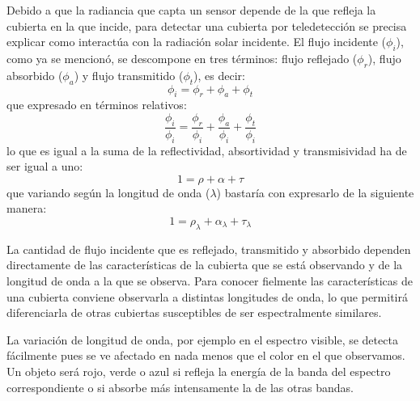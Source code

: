 Debido a que la radiancia que capta un sensor depende de la que refleja la cubierta en la que incide, para detectar una cubierta por teledetección se precisa explicar como interactúa con la radiación solar incidente. El flujo incidente ($\phi_{i}$), como ya se mencionó, se descompone en tres términos: flujo reflejado ($\phi_{r}$), flujo absorbido ($\phi_{a}$) y flujo transmitido ($\phi_{t}$), es decir:
\begin{equation}
	\phi_{i}=\phi_{r}+\phi_{a}+\phi_{t}
	\label{eq:flujoinc}
\end{equation}
que expresado en términos relativos:
\begin{equation}
	\frac{\phi_{i}}{\phi_{i}}=\frac{\phi_{r}}{\phi_{i}}+\frac{\phi_{a}}{\phi_{i}}+\frac{\phi_{t}}{\phi_{i}}
	\label{eq:flujorel}
\end{equation}
lo que es igual a la suma de la reflectividad, absortividad y transmisividad ha de ser igual a uno:
\begin{equation}
	1=\rho+\alpha+\tau
	\label{eq:flujo}
\end{equation}
que variando según la longitud de onda ($\lambda$) bastaría con expresarlo de la siguiente manera:
\begin{equation}
	1=\rho_{\lambda}+\alpha_{\lambda}+\tau_{\lambda}
	\label{eq:flujolong}
\end{equation}

La cantidad de flujo incidente que es reflejado, transmitido y absorbido dependen directamente de las características de la cubierta que se está observando y de la longitud de onda a la que se observa. Para conocer fielmente las características de una cubierta conviene observarla a distintas longitudes de onda, lo que permitirá diferenciarla de otras cubiertas susceptibles de ser espectralmente similares.%

La variación de longitud de onda, por ejemplo en el espectro visible, se detecta fácilmente pues se ve afectado en nada menos que el color en el que observamos. Un objeto será rojo, verde o azul si refleja la energía de la banda del espectro correspondiente o si absorbe más intensamente la de las otras bandas.%

